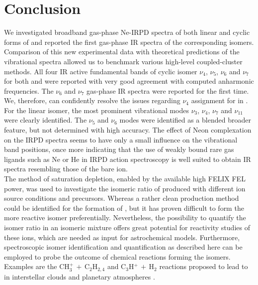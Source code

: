 \section{Conclusion}
\vspace{0.5cm}
We investigated broadband gas-phase Ne-IRPD spectra of both linear and cyclic forms of \iso and reported the first gas-phase IR spectra of the corresponding \isoD isomers. Comparison of this new experimental data with theoretical predictions of the vibrational spectra allowed us to benchmark various high-level coupled-cluster methods. All four IR active fundamental bands of cyclic isomer $\nu_4$, $\nu_5$, $\nu_6$ and $\nu_7$ for both \iso and \isoD were reported with very good agreement with computed anharmonic frequencies. The $\nu_6$ and $\nu_7$ gas-phase IR spectra were reported for the first time. We, therefore, can confidently resolve the issues regarding $\nu_4$ assignment for \cyc in \citet{RDS2010}. For the linear isomer, the most prominent vibrational modes $\nu_3$, $\nu_4$, $\nu_7$ and $\nu_{11}$ were clearly identified. The $\nu_5$ and $\nu_6$ modes were identified as a blended broader feature, but not determined with high accuracy. The effect of Neon complexation on the IRPD spectra seems to have only a small influence on the vibrational band positions, once more indicating that the use of weakly bound rare gas ligands such as Ne or He in IRPD action spectroscopy is well suited to obtain IR spectra resembling those of the bare ion. \\

The method of saturation depletion, enabled by the available high FELIX FEL power, was used to investigate the isomeric ratio of \iso produced with different ion source conditions and precursors. Whereas a rather clean production method could be identified for the formation of \cyc, but it has proven difficult to form the more reactive \lin isomer preferentially. Nevertheless, the possibility to quantify the isomer ratio in an isomeric mixture offers great potential for reactivity studies of these ions, which are needed as input for astrochemical models. Furthermore, spectroscopic isomer identification and quantification as described here can be employed to probe the outcome of chemical reactions forming the \iso isomers. Examples are the CH$_3^+ \, + \, $C$_2$H$_{2,4}$ and C$_3$H$^+ \, + \, $H$_2$ reactions proposed to lead to \iso in interstellar clouds and planetary atmospheres \citep{SA1987,Ali2013}.  \\


